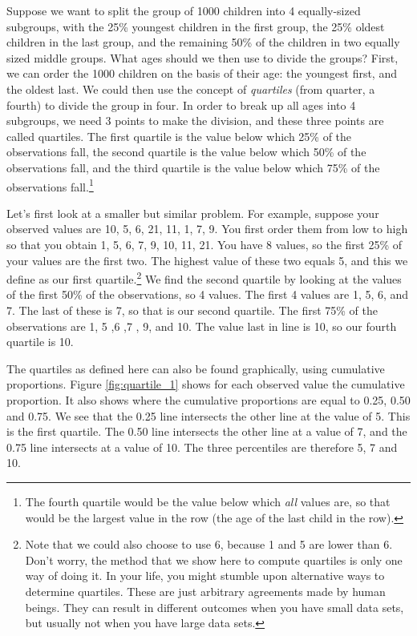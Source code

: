 Suppose we want to split the group of 1000 children into 4 equally-sized subgroups, with the 25\% youngest children in the first group, the 25\% oldest children in the last group, and the remaining 50\% of the children in two equally sized middle groups. What ages should we then use to divide the groups? First, we can order the 1000 children on the basis of their age: the youngest first, and the oldest last. We could then use the concept of \textit{quartiles} (from quarter, a fourth) to divide the group in four. In order to break up all ages into 4 subgroups, we need 3 points to make the division, and these three points are called quartiles. The first quartile is the value below which 25\% of the observations fall, the second quartile is the value below which 50\% of the observations fall, and the third quartile is the value below which 75\% of the observations fall.\footnote{The fourth quartile would be the value below which \textit{all} values are, so that would be the largest value in the row (the age of the last child in the row).}

Let's first look at a smaller but similar problem. For example, suppose your observed values are {10, 5, 6, 21, 11, 1, 7, 9}. You first order them from low to high so that you obtain {1, 5, 6, 7, 9, 10, 11, 21}. You have 8 values, so the first 25\% of your values are the first two. The highest value of these two equals 5, and this we define as our first quartile.\footnote{Note that we could also choose to use 6,
because 1 and 5 are lower than 6. Don't worry, the method that we show here to compute quartiles is only one way of doing it. In your life, you might stumble upon alternative ways to determine quartiles. These are just arbitrary agreements made by human beings. They can result in different outcomes when you have small data sets, but usually not when you have large data sets.} We find the second quartile by looking at the values of the first 50\% of the observations, so 4 values. The first 4 values are 1, 5, 6, and 7. The last of these is 7, so that is our second quartile. The first 75\% of the observations are 1, 5 ,6 ,7 , 9, and 10. The value last in line is 10, so our fourth quartile is 10.

The quartiles as defined here can also be found graphically, using cumulative proportions. Figure \ref{fig:quartile_1} shows for each observed value the cumulative proportion. It also shows where the cumulative proportions are equal to 0.25, 0.50 and 0.75. We see that the 0.25 line intersects the other line at the value of 5. This is the first quartile. The 0.50 line intersects the other line at a value of 7, and the 0.75 line intersects at a value of 10. The three percentiles are therefore 5, 7 and 10.


